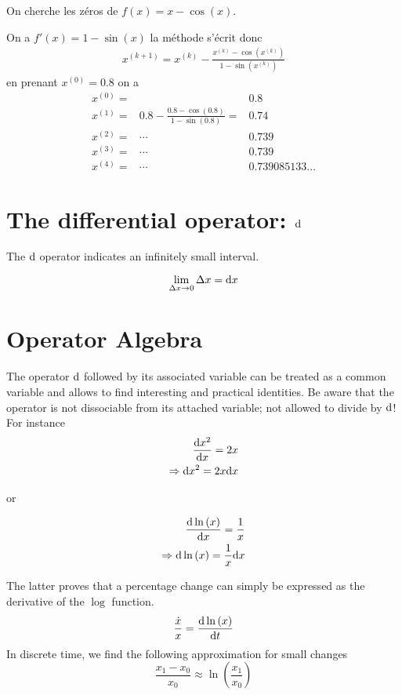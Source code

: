 \begin{myExample}
On cherche les zéros de	$f(x)=x-\cos{(x)}$.

On a $f'(x)=1-\sin{(x)}$ la méthode s'écrit donc
\begin{eqnarray*}
	x^{(k+1)}=x^{(k)}-\frac{x^{(k)}-\cos{(x^{(k)})}}{1-\sin{(x^{(k)})}}
\end{eqnarray*}
en prenant $x^{(0)}=0.8$ on a
\begin{eqnarray*}
	x^{(0)}=& &0.8
	\\
	x^{(1)}=&0.8-\frac{0.8-\cos{(0.8)}}{1-\sin{(0.8)}}=&0.74
	\\
	x^{(2)}=&\cdots&0.739
	\\
	x^{(3)}=&\cdots&0.739
	\\
	x^{(4)}=&\cdots&0.739085133\dots
\end{eqnarray*}
\end{myExample}

\section{The differential operator: ${\rm d}$}
The $\rm d$ operator indicates an infinitely small interval.

\begin{equation}
	\lim_{\Delta x\rightarrow0}\Delta x={\rm d}x
\end{equation}
\section{Operator Algebra}
The operator $\rm d$ followed by its associated variable can be treated as a common variable and allows to find interesting and practical identities. Be aware that the operator is not dissociable from its attached variable; not allowed to divide by ${\rm d}$! For instance
\begin{eqnarray}
	\frac{{\rm d} x^2}{{\rm d}x}=2x\\
	\Rightarrow
	{\rm d}x^2 =2x{\rm d}x
\end{eqnarray}

or

\begin{eqnarray}
	\frac{{\rm d} \ln{(x)}}{{\rm d}x}=\frac{1}{x}\\
	\Rightarrow
	{\rm d} \ln{(x)} =\frac{1}{x}{\rm d}x
\end{eqnarray}

The latter proves that a percentage change can simply be expressed as the derivative of the $\log$ function.
\begin{equation}
	\frac{\dot x}{x} = \frac{{\rm d} \ln{(x)}}{{\rm d}t}
\end{equation}
In discrete time, we find the following approximation for small changes
\begin{equation}
	\frac{x_1-x_0}{x_0}\approx\ln{\left(\frac{x_1}{x_0}\right)}
\end{equation}


